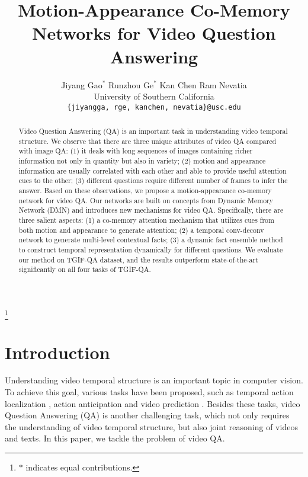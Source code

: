 \documentclass[10pt,twocolumn,letterpaper]{article}
\begin{document}
\title{Motion-Appearance Co-Memory Networks for Video Question Answering}


\author{Jiyang Gao$^{*}$ \quad Runzhou Ge$^{*}$  \quad Kan Chen \quad Ram Nevatia \\
University of Southern California \\
{\tt\small \{jiyangga, rge, kanchen, nevatia\}@usc.edu} 
}

\maketitle

\newcommand\blfootnote[1]{\begingroup
  \renewcommand\thefootnote{}\footnote{#1}\addtocounter{footnote}{-1}\endgroup
}

\blfootnote{$*$ indicates equal contributions.}






\begin{abstract}
Video Question Answering (QA) is an important task in understanding video temporal structure. We observe that there are three unique attributes of video QA compared with image QA: (1) it deals with long sequences of images containing richer information not only in quantity but also in variety; (2) motion and appearance information are usually correlated with each other and able to provide useful attention cues to the other; (3) different questions require different number of frames to infer the answer. Based on these observations, we propose a motion-appearance co-memory network for video QA. 
Our networks are built on concepts from Dynamic Memory Network (DMN) and introduces new mechanisms for video QA. Specifically, there are three salient aspects: (1) a co-memory attention mechanism that utilizes cues from both motion and appearance to generate attention; (2) a temporal conv-deconv network to generate multi-level contextual facts; (3) a dynamic fact ensemble method to construct temporal representation dynamically for different questions. We evaluate our method on TGIF-QA dataset, and the results outperform state-of-the-art significantly on all four tasks of TGIF-QA.
\end{abstract}



\section{Introduction}
\label{sec:intro}

Understanding video temporal structure is an important topic in computer vision. To achieve this goal, various tasks have been proposed, such as temporal action localization \cite{Shou_2016_CVPR, Gao_2017_cbr}, action anticipation \cite{gao2017red} and video prediction \cite{villegas2016decomposing}. Besides these tasks, video Question Answering (QA) \cite{Jang_2017_CVPR, Tapaswi_2016_CVPR} is another challenging task, which not only requires the understanding of video temporal structure, but also joint reasoning of videos and texts. In this paper, we tackle the problem of video QA.  
\end{document}
